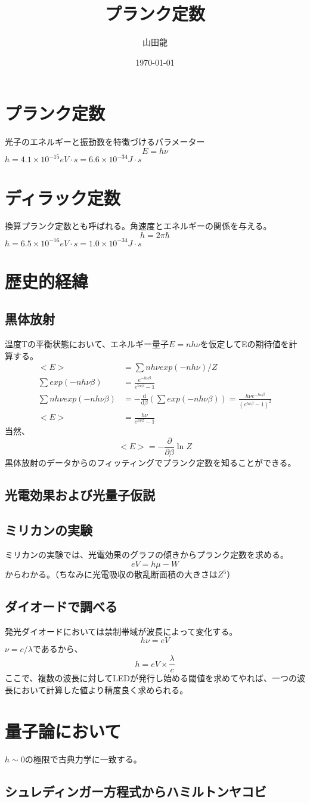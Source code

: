 \documentclass{jsarticle}
\date{\today}
\author{山田龍}
\title{プランク定数}
\newcommand{\pder}[2][]{\frac{\partial#1}{\partial#2}}
\newcommand{\dder}[2][]{\frac{\mathrm{d}#1}{\mathrm{d}#2}}
\newcommand{\beq}{\begin{equation}}
\newcommand{\eeq}{\end{equation}}
\begin{document}
\maketitle
\section{プランク定数}
光子のエネルギーと振動数を特徴づけるパラメーター
\beq
E = h \nu
\eeq
$h = 4.1 \times 10^{-15} eV \cdot s = 6.6 \times 10^{-34} J \cdot s$
\section{ディラック定数}
換算プランク定数とも呼ばれる。角速度とエネルギーの関係を与える。
\beq
h = 2 \pi \hbar
\eeq
$\hbar = 6.5 \times 10^{-16} eV \cdot s = 1.0 \times 10^{-34} J \cdot s$
\section{歴史的経緯}
\subsection{黒体放射}
温度Tの平衡状態において、エネルギー量子$E =nh\nu$を仮定してEの期待値を計算する。
\begin{align}
    <E> &= \sum nh\nu exp(- nh\nu) / Z\\
    \sum exp(- nh\nu \beta) &=  \frac{e^{-h\nu \beta}}{e^{hv \beta} - 1}\\
    \sum nh\nu exp(- nh\nu\beta) &= - \dder[]{\beta} (\sum exp(-nh\nu \beta)) = \frac{h\nu e^{-h\nu \beta}}{(e^{hv \beta} - 1)^2}\\
    <E> &= \frac{h\nu}{e^{hv \beta} - 1}
\end{align}
当然、
\beq
	<E> = - \pder[]{\beta} \ln Z
\eeq
黒体放射のデータからのフィッティングでプランク定数を知ることができる。
\subsection{光電効果および光量子仮説}
\subsection{ミリカンの実験}
ミリカンの実験では、光電効果のグラフの傾きからプランク定数を求める。
\beq
eV = h\mu - W
\eeq
からわかる。（ちなみに光電吸収の散乱断面積の大きさは$Z^5$）
\subsection{ダイオードで調べる}
発光ダイオードにおいては禁制帯域が波長によって変化する。
\beq 
h \nu = eV
\eeq
$\nu = c / \lambda$であるから、
\beq
h = eV \times \frac{\lambda}{c}
\eeq
ここで、複数の波長に対してLEDが発行し始める閾値を求めてやれば、一つの波長において計算した値より精度良く求められる。
\section{量子論において}
$h \sim 0$の極限で古典力学に一致する。
\subsection{シュレディンガー方程式からハミルトンヤコビ}
\end{document}
